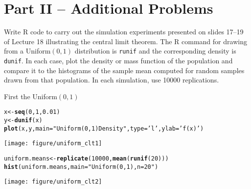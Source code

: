 \documentclass[addpoints,12pt]{exam}\usepackage[]{graphicx}\usepackage[]{color}
\makeatletter
\def\maxwidth{ %
  \ifdim\Gin@nat@width>\linewidth
    \linewidth
  \else
    \Gin@nat@width
  \fi
}
\newcommand{\hlnum}[1]{\textcolor[rgb]{0.686,0.059,0.569}{#1}}%
\newcommand{\hlstr}[1]{\textcolor[rgb]{0.192,0.494,0.8}{#1}}%
\newcommand{\hlstd}[1]{\textcolor[rgb]{0.345,0.345,0.345}{#1}}%
\newcommand{\hlkwb}[1]{\textcolor[rgb]{0.69,0.353,0.396}{#1}}%
\newcommand{\hlkwc}[1]{\textcolor[rgb]{0.333,0.667,0.333}{#1}}%
\newcommand{\hlkwd}[1]{\textcolor[rgb]{0.737,0.353,0.396}{\textbf{#1}}}%
\newenvironment{kframe}{%
 \def\at@end@of@kframe{}%
 \ifinner\ifhmode%
  \def\at@end@of@kframe{\end{minipage}}%
  \begin{minipage}{\columnwidth}%
 \fi\fi%
 \def\FrameCommand##1{\hskip\@totalleftmargin \hskip-\fboxsep
 \colorbox{shadecolor}{##1}\hskip-\fboxsep
     \hskip-\linewidth \hskip-\@totalleftmargin \hskip\columnwidth}%
 \MakeFramed {\advance\hsize-\width
   \@totalleftmargin\z@ \linewidth\hsize
   \@setminipage}}%
 {\par\unskip\endMakeFramed%
 \at@end@of@kframe}
\newenvironment{knitrout}{}{} %
\makeatother
\begin{document}
\begin{questions}
\begin{solution}
		\end{solution}
\end{questions}



 \section*{Part II -- Additional Problems}

\begin{questions}

\question Write R code to carry out the simulation experiments presented on slides 17--19 of Lecture 18 illustrating the central limit theorem. The R command for drawing from a Uniform$(0,1)$ distribution is \texttt{runif} and the corresponding density is \texttt{dunif}. In each case, plot the density or mass function of the population and compare it to the histograms of the sample mean computed for random samples drawn from that population. In each simulation, use 10000 replications.
	\begin{solution}
		First the Uniform$(0,1)$
\begin{knitrout}
\color{fgcolor}\begin{kframe}
\begin{alltt}
\hlstd{x} \hlkwb{<-} \hlkwd{seq}\hlstd{(}\hlnum{0}\hlstd{,} \hlnum{1}\hlstd{,} \hlnum{0.01}\hlstd{)}
\hlstd{y} \hlkwb{<-} \hlkwd{dunif}\hlstd{(x)}
\hlkwd{plot}\hlstd{(x, y,} \hlkwc{main} \hlstd{=} \hlstr{"Uniform(0,1) Density"}\hlstd{,} \hlkwc{type} \hlstd{=} \hlstr{'l'}\hlstd{,} \hlkwc{ylab} \hlstd{=} \hlstr{'f(x)'}\hlstd{)}
\end{alltt}
\end{kframe}

{\centering \texttt{[image: figure/uniform\_clt1]} 

}


\begin{kframe}\begin{alltt}
\hlstd{uniform.means} \hlkwb{<-} \hlkwd{replicate}\hlstd{(}\hlnum{10000}\hlstd{,} \hlkwd{mean}\hlstd{(}\hlkwd{runif}\hlstd{(}\hlnum{20}\hlstd{)))}
\hlkwd{hist}\hlstd{(uniform.means,} \hlkwc{main} \hlstd{=} \hlstr{"Uniform(0,1), n = 20"}\hlstd{)}
\end{alltt}
\end{kframe}

{\centering \texttt{[image: figure/uniform\_clt2]} 

}




\end{knitrout}
\end{solution}
\end{questions}
\end{document}
